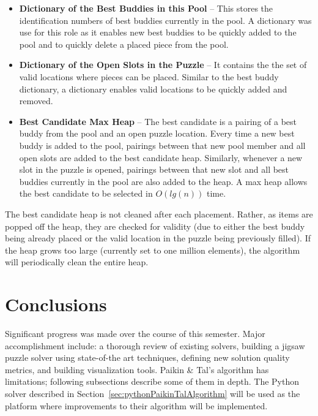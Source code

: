 \documentclass{report}
\begin{document}
\begin{itemize}

	\item \textbf{Dictionary of the Best Buddies in this Pool} -- This stores the identification numbers of best buddies currently in the pool.  A dictionary was use for this role as it enables new best buddies to be quickly added to the pool  and to quickly delete a placed piece from the pool.
	
	\item \textbf{Dictionary of the Open Slots in the Puzzle} -- It contains the the set of valid locations where pieces can be placed.  Similar to the best buddy dictionary, a dictionary enables valid locations to be quickly added and removed.

	\item \textbf{Best Candidate Max Heap} -- The best candidate is a pairing of a best buddy from the pool and an open puzzle location.  Every time a new best buddy is added to the pool, pairings between that new pool member and all open slots are added to the best candidate heap.  Similarly, whenever a new slot in the puzzle is opened, pairings between that new slot and all best buddies currently in the pool are also added to the heap.  A max heap allows the best candidate to be selected in $O(lg(n))$ time.
	
\end{itemize}

The best candidate heap is not cleaned after each placement.  Rather, as items are popped off the heap, they are checked for validity (due to either the best buddy being already placed or the valid location in the puzzle being previously filled). If the heap grows too large (currently set to one million elements), the algorithm will periodically clean the entire heap.







\pagebreak
\section{Conclusions}\label{sec:conclusions}

Significant progress was made over the course of this semester.  Major accomplishment include: a thorough review of existing solvers, building a jigsaw puzzle solver using state-of-the art techniques, defining new solution quality metrics, and building visualization tools.  Paikin \& Tal's algorithm has limitations; following subsections describe some of them in depth.  The Python solver described in Section~\ref{sec:pythonPaikinTalAlgorithm} will be used as the platform where improvements to their algorithm will be implemented.
\end{document}
